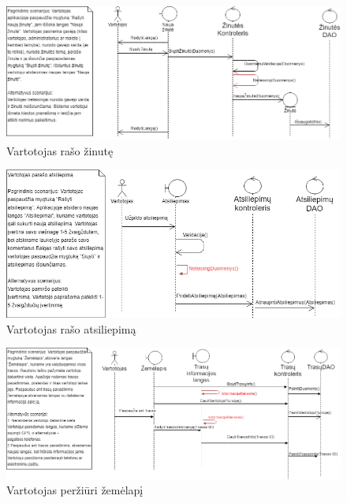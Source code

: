 \documentclass[oneside]{VUMIFPSkursinis}
\begin{document}
			\begin{figure}[h]
    				\centering
    				\includegraphics[width=1\textwidth]{seq11.png}
    				\caption{Vartotojas rašo žinutę}
    				\label{fig:Vartotojas rašo žinutę}
			\end{figure}

			\begin{figure}[h]
    				\centering
    				\includegraphics[width=1\textwidth]{seq12.png}
    				\caption{Vartotojas rašo atsiliepimą}
    				\label{fig:Vartotojas rašo atsiliepimą}
			\end{figure}

			\begin{figure}[h]
    				\centering
    				\includegraphics[width=1\textwidth]{seq13.png}
    				\caption{Vartotojas peržiūri žemėlapį}
    				\label{fig:Vartotojas peržiūri žemėlapį}
			\end{figure}
\end{document}
